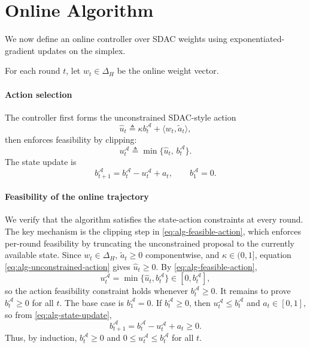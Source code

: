 \documentclass[11pt]{article}
\begin{document}
\section{Online Algorithm}
\label{sec:online-algorithm}

We now define an online controller over SDAC weights using exponentiated-gradient updates on the simplex.

For each round $t$, let $w_t\in\Delta_H$ be the online weight vector.

\paragraph{Action selection}
The controller first forms the unconstrained SDAC-style action
\begin{equation}
\label{eq:alg-unconstrained-action}
\widehat{u}_t \triangleq \kappa b_t^{\mathcal A} + \langle w_t,\widetilde{a}_t\rangle,
\end{equation}
then enforces feasibility by clipping:
\begin{equation}
\label{eq:alg-feasible-action}
u_t^{\mathcal A} \triangleq \min\{\widehat{u}_t,\,b_t^{\mathcal A}\}.
\end{equation}
The state update is
\begin{equation}
\label{eq:alg-state-update}
b_{t+1}^{\mathcal A} = b_t^{\mathcal A} - u_t^{\mathcal A} + a_t,
\qquad b_1^{\mathcal A}=0.
\end{equation}

\paragraph{Feasibility of the online trajectory}
We verify that the algorithm satisfies the state-action constraints at every round. The key mechanism is the clipping step in \eqref{eq:alg-feasible-action}, which enforces per-round feasibility by truncating the unconstrained proposal to the currently available state. Since $w_t\in\Delta_H$, $\widetilde{a}_t\ge 0$ componentwise, and $\kappa\in(0,1]$, equation \eqref{eq:alg-unconstrained-action} gives $\widehat u_t\ge 0$. By \eqref{eq:alg-feasible-action},
\[
u_t^{\mathcal A}=\min\{\widehat u_t,b_t^{\mathcal A}\}\in[0,b_t^{\mathcal A}],
\]
so the action feasibility constraint holds whenever $b_t^{\mathcal A}\ge 0$. It remains to prove $b_t^{\mathcal A}\ge 0$ for all $t$. The base case is $b_1^{\mathcal A}=0$. If $b_t^{\mathcal A}\ge 0$, then $u_t^{\mathcal A}\le b_t^{\mathcal A}$ and $a_t\in[0,1]$, so from \eqref{eq:alg-state-update},
\[
b_{t+1}^{\mathcal A}=b_t^{\mathcal A}-u_t^{\mathcal A}+a_t\ge 0.
\]
Thus, by induction, $b_t^{\mathcal A}\ge 0$ and $0\le u_t^{\mathcal A}\le b_t^{\mathcal A}$ for all $t$.
\end{document}
